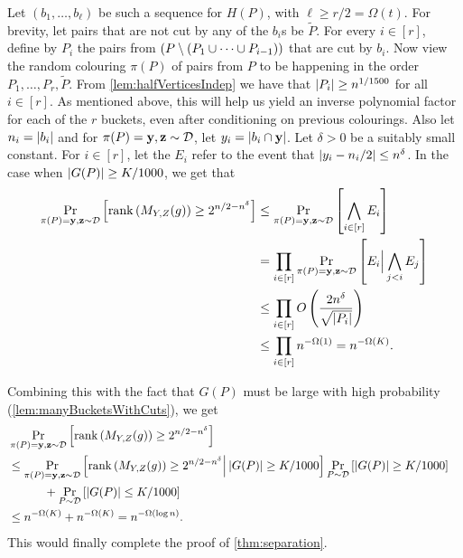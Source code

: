 Let $(b_1,\ldots,b_\ell)$ be such a sequence for $H(P)$, with $\ell \geq r/2 = \Omega(t)$.
For brevity, let pairs that are not cut by any of the $b_i$s be $\tilde{P}$.
For every $i \in [r]$, define by $P_i$ the pairs from $\left( P \setminus \left( P_1 \cup \cdots \cup P_{i-1}\right) \right)$ that are cut by $b_i$.
Now view the random colouring $\pi(P)$ of pairs from $P$ to be happening in the order $P_1,\ldots,P_r,\tilde{P}$.
From \autoref{lem:halfVerticesIndep} we have that $\left|P_i\right| \geq n^{1/1500}$ for all $i \in [r]$.
As mentioned above, this will help us yield an inverse polynomial factor for each of the $r$ buckets, even after conditioning on previous colourings.
Also let $n_i = \left|b_i\right|$ and for $\pi(P)=\mathbf{y},\mathbf{z} \sim \mathcal{D}$, let $y_i = \left|b_i \cap \mathbf{y}\right|$.
Let $\delta > 0$ be a suitably small constant.
For $i \in [r]$, let the $E_i$ refer to the event that $\left|y_i - n_i/2\right| \leq n^{\delta}$.
In the case when $\left|G(P)\right| \geq K/1000$, we get that
\begin{align*}
\Pr_{\pi(P)=\mathbf{y},\mathbf{z} \sim \mathcal{D}} \left[\operatorname{rank}\left(M_{Y,Z}(g)\right) \geq 2^{n/2 - n^{\delta}}\right] &\leq \Pr_{\pi(P)=\mathbf{y},\mathbf{z} \sim \mathcal{D}} \left[\bigwedge_{i \in [r]} E_i\right]\\
&= \prod_{i \in [r]} \Pr_{\pi(P)=\mathbf{y},\mathbf{z} \sim \mathcal{D}} \left[E_i \Big{|} \bigwedge_{j < i} E_j \right]\\
&\leq \prod_{i \in [r]} O\left(\frac{2n^{\delta}}{\sqrt{\left|P_i\right|}}\right)\\
&\leq \prod_{i \in [r]} n^{-\Omega(1)} = n^{-\Omega(K)}.
\end{align*}

\noindent
Combining this with the fact that $G(P)$ must be large with high probability (\autoref{lem:manyBucketsWithCuts}), we get
\begin{align*}
&\Pr_{\pi(P)=\mathbf{y},\mathbf{z} \sim \mathcal{D}} \left[\operatorname{rank}\left(M_{Y,Z}(g)\right) \geq 2^{n/2 - n^{\delta}}\right] &\\
&\leq \Pr_{\pi(P)=\mathbf{y},\mathbf{z} \sim \mathcal{D}} \left[\operatorname{rank}\left(M_{Y,Z}(g)\right) \geq 2^{n/2 - n^{\delta}} \Big{|} \left|G(P)\right| \geq K/1000\right] \Pr_{P \sim \mathcal{D}} \left[\left|G(P)\right| \geq K/1000\right]\\
&  \qquad \quad+ \Pr_{P \sim \mathcal{D}} \left[\left|G(P)\right| \leq K/1000\right]\\
&\leq n^{-\Omega(K)}+ n^{-\Omega(K)} = n^{-\Omega(\log n)}. 
\end{align*}
This would finally complete the proof of \autoref{thm:separation}.

